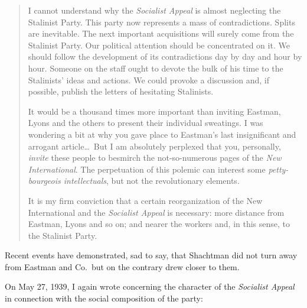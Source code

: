\begin{quote}
  I cannot understand why the \emph{Socialist Appeal} is almost neglecting the Stalinist Party. This party now represents a mass of contradictions. Splits are inevitable. The next important acquisitions will surely come from the Stalinist Party. Our political attention should be concentrated on it. We should follow the development of its contradictions day by day and hour by hour. Someone on the staff ought to devote the bulk of his time to the Stalinists’ ideas and actions. We could provoke a discussion and, if possible, publish the letters of hesitating Stalinists.

  It would be a thousand times more important than inviting Eastman, Lyons and the others to present their individual sweatings. I was wondering a bit at why you gave place to Eastman’s last insignificant and arrogant article\dots\ But I am absolutely perplexed that you, personally, \emph{invite} these people to besmirch the not-so-numerous pages of the \emph{New International}. The perpetuation of this polemic can interest some \emph{petty-bourgeois intellectuals}, but not the revolutionary elements.

  It is my firm conviction that a certain reorganization of the New International and the \emph{Socialist Appeal} is necessary: more distance from Eastman, Lyons and so on; and nearer the workers and, in this sense, to the Stalinist Party.
\end{quote}

Recent events have demonstrated, sad to say, that Shachtman did not turn away from Eastman and Co.\ but on the contrary drew closer to them.


\noindent
On May 27, 1939, I again wrote concerning the character of the \emph{Socialist Appeal} in connection with the social composition of the party:

